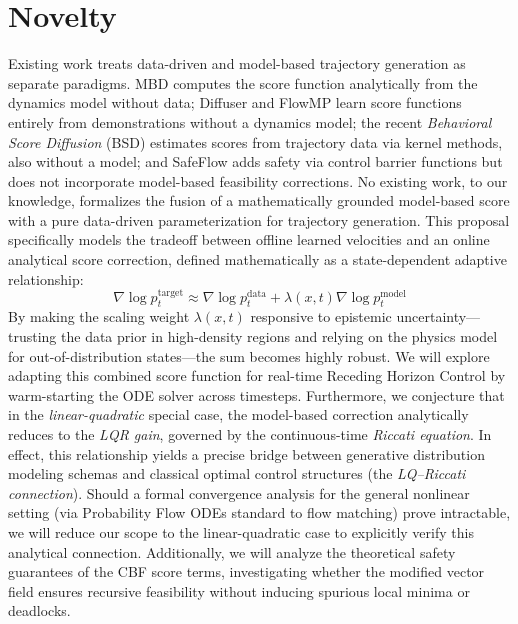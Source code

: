\documentclass[letterpaper, 10 pt, conference]{ieeeconf}  %
\begin{document}
\section{Novelty}


Existing work treats data-driven and model-based trajectory generation as separate paradigms. MBD \cite{mbd} computes the score function analytically from the dynamics model without data; Diffuser \cite{janner2022} and FlowMP \cite{flowmp} learn score functions entirely from demonstrations without a dynamics model; the recent \textit{Behavioral Score Diffusion} (BSD) \cite{bsd} estimates scores from trajectory data via kernel methods, also without a model; and SafeFlow \cite{safeflow} adds safety via control barrier functions but does not incorporate model-based feasibility corrections. No existing work, to our knowledge, formalizes the fusion of a mathematically grounded model-based score with a pure data-driven parameterization for trajectory generation. This proposal specifically models the tradeoff between offline learned velocities and an online analytical score correction, defined mathematically as a state-dependent adaptive relationship:
\[
    \nabla \log p^{\mathrm{target}}_t \approx \nabla \log p^{\mathrm{data}}_t + \lambda(x, t) \nabla \log p^{\mathrm{model}}_t
\]
By making the scaling weight $\lambda(x, t)$ responsive to epistemic uncertainty---trusting the data prior in high-density regions and relying on the physics model for out-of-distribution states---the sum becomes highly robust. We will explore adapting this combined score function for real-time Receding Horizon Control by warm-starting the ODE solver across timesteps. Furthermore, we conjecture that in the \textit{linear-quadratic} special case, the model-based correction analytically reduces to the \textit{LQR gain}, governed by the continuous-time \textit{Riccati equation}. In effect, this relationship yields a precise bridge between generative distribution modeling schemas and classical optimal control structures (the \textit{LQ--Riccati connection}). Should a formal convergence analysis for the general nonlinear setting (via Probability Flow ODEs standard to flow matching) prove intractable, we will reduce our scope to the linear-quadratic case to explicitly verify this analytical connection. Additionally, we will analyze the theoretical safety guarantees of the CBF score terms, investigating whether the modified vector field ensures recursive feasibility without inducing spurious local minima or deadlocks.
\end{document}
